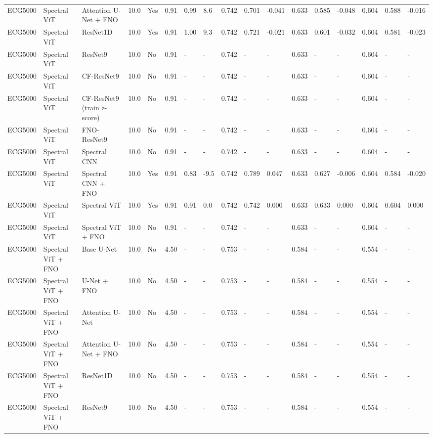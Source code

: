\begin{longtable}{lllllllllllllllll}
ECG5000 & Spectral ViT & Attention U-Net + FNO & 10.0 & Yes & 0.91 & 0.99 & 8.6 & 0.742 & 0.701 & -0.041 & 0.633 & 0.585 & -0.048 & 0.604 & 0.588 & -0.016 \\
ECG5000 & Spectral ViT & ResNet1D & 10.0 & Yes & 0.91 & 1.00 & 9.3 & 0.742 & 0.721 & -0.021 & 0.633 & 0.601 & -0.032 & 0.604 & 0.581 & -0.023 \\
ECG5000 & Spectral ViT & ResNet9 & 10.0 & No & 0.91 & - & - & 0.742 & - & - & 0.633 & - & - & 0.604 & - & - \\
ECG5000 & Spectral ViT & CF-ResNet9 & 10.0 & No & 0.91 & - & - & 0.742 & - & - & 0.633 & - & - & 0.604 & - & - \\
ECG5000 & Spectral ViT & CF-ResNet9 (train z-score) & 10.0 & No & 0.91 & - & - & 0.742 & - & - & 0.633 & - & - & 0.604 & - & - \\
ECG5000 & Spectral ViT & FNO-ResNet9 & 10.0 & No & 0.91 & - & - & 0.742 & - & - & 0.633 & - & - & 0.604 & - & - \\
ECG5000 & Spectral ViT & Spectral CNN & 10.0 & No & 0.91 & - & - & 0.742 & - & - & 0.633 & - & - & 0.604 & - & - \\
ECG5000 & Spectral ViT & Spectral CNN + FNO & 10.0 & Yes & 0.91 & 0.83 & -9.5 & 0.742 & 0.789 & 0.047 & 0.633 & 0.627 & -0.006 & 0.604 & 0.584 & -0.020 \\
ECG5000 & Spectral ViT & Spectral ViT & 10.0 & Yes & 0.91 & 0.91 & 0.0 & 0.742 & 0.742 & 0.000 & 0.633 & 0.633 & 0.000 & 0.604 & 0.604 & 0.000 \\
ECG5000 & Spectral ViT & Spectral ViT + FNO & 10.0 & No & 0.91 & - & - & 0.742 & - & - & 0.633 & - & - & 0.604 & - & - \\
ECG5000 & Spectral ViT + FNO & Base U-Net & 10.0 & No & 4.50 & - & - & 0.753 & - & - & 0.584 & - & - & 0.554 & - & - \\
ECG5000 & Spectral ViT + FNO & U-Net + FNO & 10.0 & No & 4.50 & - & - & 0.753 & - & - & 0.584 & - & - & 0.554 & - & - \\
ECG5000 & Spectral ViT + FNO & Attention U-Net & 10.0 & No & 4.50 & - & - & 0.753 & - & - & 0.584 & - & - & 0.554 & - & - \\
ECG5000 & Spectral ViT + FNO & Attention U-Net + FNO & 10.0 & No & 4.50 & - & - & 0.753 & - & - & 0.584 & - & - & 0.554 & - & - \\
ECG5000 & Spectral ViT + FNO & ResNet1D & 10.0 & No & 4.50 & - & - & 0.753 & - & - & 0.584 & - & - & 0.554 & - & - \\
ECG5000 & Spectral ViT + FNO & ResNet9 & 10.0 & No & 4.50 & - & - & 0.753 & - & - & 0.584 & - & - & 0.554 & - & - \\

\end{longtable}
